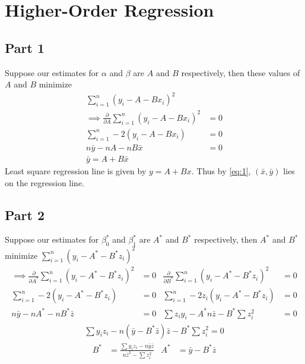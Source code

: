 \section{Higher-Order Regression}

\subsection{Part 1}
Suppose our estimates for $\alpha$ and $\beta$ are $A$ and $B$ respectively,
then these values of $A$ and $B$ minimize
\begin{align}
	\sum_{i=1}^{n} (y_i - A - Bx_i)^2                                                    \\
	\implies \frac{\partial}{\partial A}\sum_{i=1}^{n} (y_i - A - Bx_i)^2 & = 0          \\
	\sum_{i=1}^{n} -2(y_i - A - Bx_i)                                     & = 0          \\
	n\bar{y} - nA - nB\bar{x}                                             & = 0          \\
	\bar{y} = A + B\bar{x}                                                & \label{eq:1}
\end{align}
Least square regression line is given by $y = A + Bx$. Thus by \eqref{eq:1},
$(\bar{x}, \bar{y})$ lies on the regression line.

\subsection{Part 2}
Suppose our estimates for $\beta_0^*$ and $\beta_1^*$ are $A^*$ and $B^*$ respectively,
then $A^*$ and $B^*$ minimize $\sum_{i=1}^{n} (y_i - A^* - B^*z_i)^2$
\begin{align}
	\implies \frac{\partial}{\partial A^*}\sum_{i=1}^{n} (y_i - A^* - B^*z_i)^2 & = 0 & \frac{\partial}{\partial B^*}\sum_{i=1}^{n} (y_i - A^* - B^*z_i)^2 & = 0 \\
	\sum_{i=1}^{n} -2(y_i - A^* - B^*z_i)                                       & = 0 & \sum_{i=1}^{n} -2z_i(y_i - A^* - B^*z_i)                           & = 0 \\
	n\bar{y} - nA^* - nB^*\bar{z}                                               & = 0 & \sum z_iy_i - A^*n\bar{z} - B^*\sum z_i^2                          & = 0
\end{align}
\begin{align}
	\sum y_iz_i - n(\bar{y} - B^*\bar{z})\bar{z} - B^*\sum z_i^2  = 0
\end{align}
\begin{align}
	B^* & = \frac{\sum y_iz_i - n\bar{y}\bar{z}}{n\bar{z}^2-\sum z_i^2} & A^* & = \bar{y} - B^*\bar{z}
\end{align}

